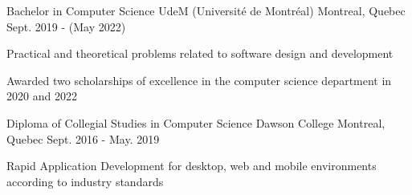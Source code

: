 

\begin{cventries}

  \cventry
    {Bachelor in Computer Science} %
    {UdeM (Université de Montréal)} %
    {Montreal, Quebec} %
    {Sept. 2019 - (May 2022)} %
    {
      \begin{cvitems} %
        \item {Practical and theoretical problems related to software design and development}
        \item {Awarded two scholarships of excellence in the computer science department in 2020 and 2022}
      \end{cvitems}
    }
  \cventry
    {Diploma of Collegial Studies in Computer Science} %
    {Dawson College} %
    {Montreal, Quebec} %
    {Sept. 2016 - May. 2019} %
    {
      \begin{cvitems} %
        \item {Rapid Application Development for desktop, web and mobile environments according to industry standards}
      \end{cvitems}
    }

\end{cventries}

